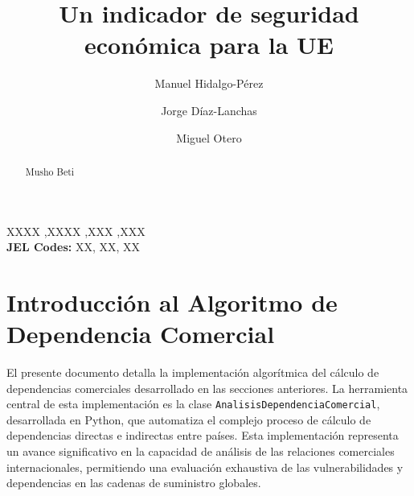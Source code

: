 \documentclass[authoryear]{elsarticle}
\begin{document}
\begin{frontmatter}

\title{Un indicador de seguridad económica para la UE}

\author[1]{Manuel Hidalgo-Pérez%
 }

\author[2]{Jorge Díaz-Lanchas}

\author[3]{Miguel Otero}







\begin{abstract}
Musho Beti
\end{abstract}

\begin{keyword}
XXXX \sep XXXX \sep XXX \sep XXX \\
\textbf{JEL Codes:} XX, XX, XX
\end{keyword}

\end{frontmatter}

\section{Introducción al Algoritmo de Dependencia Comercial}

El presente documento detalla la implementación algorítmica del cálculo de dependencias comerciales desarrollado en las secciones anteriores. La herramienta central de esta implementación es la clase \texttt{AnalisisDependenciaComercial}, desarrollada en Python, que automatiza el complejo proceso de cálculo de dependencias directas e indirectas entre países. Esta implementación representa un avance significativo en la capacidad de análisis de las relaciones comerciales internacionales, permitiendo una evaluación exhaustiva de las vulnerabilidades y dependencias en las cadenas de suministro globales.
\end{document}

